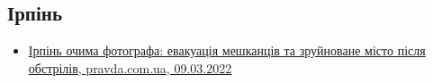  
 
 
 
 
\subsection{Ірпінь}
\label{sec:topics.vojna.irpen}

\begin{itemize} %
\item \hyperlink{09_03_2022.stz.news.ua.pravda.1.irpen}{%
Ірпінь очима фотографа: евакуація мешканців та зруйноване місто після обстрілів, %
pravda.com.ua, 09.03.2022%
}

\end{itemize} %

